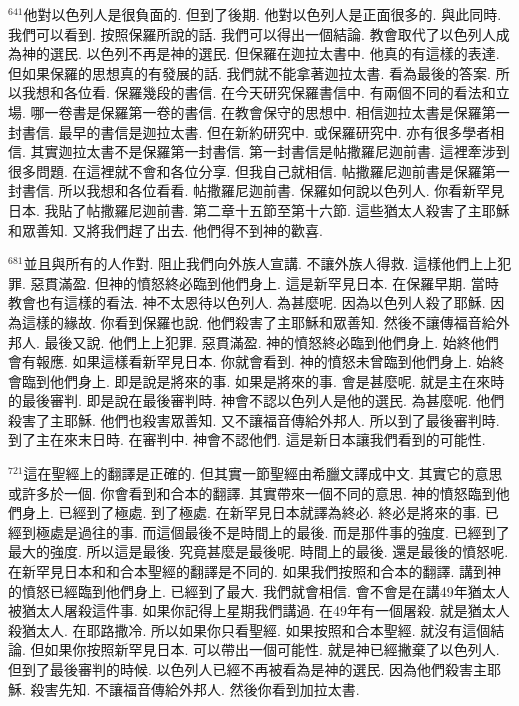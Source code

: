 \documentclass{book}
\begin{document}
$^{641}$他對以色列人是很負面的.
但到了後期.
他對以色列人是正面很多的.
與此同時.
我們可以看到.
按照保羅所說的話.
我們可以得出一個結論.
教會取代了以色列人成為神的選民.
以色列不再是神的選民.
但保羅在迦拉太書中.
他真的有這樣的表達.
但如果保羅的思想真的有發展的話.
我們就不能拿著迦拉太書.
看為最後的答案.
所以我想和各位看.
保羅幾段的書信.
在今天研究保羅書信中.
有兩個不同的看法和立場.
哪一卷書是保羅第一卷的書信.
在教會保守的思想中.
相信迦拉太書是保羅第一封書信.
最早的書信是迦拉太書.
但在新約研究中.
或保羅研究中.
亦有很多學者相信.
其實迦拉太書不是保羅第一封書信.
第一封書信是帖撒羅尼迦前書.
這裡牽涉到很多問題.
在這裡就不會和各位分享.
但我自己就相信.
帖撒羅尼迦前書是保羅第一封書信.
所以我想和各位看看.
帖撒羅尼迦前書.
保羅如何說以色列人.
你看新罕見日本.
我貼了帖撒羅尼迦前書.
第二章十五節至第十六節.
這些猶太人殺害了主耶穌和眾善知.
又將我們趕了出去.
他們得不到神的歡喜.

$^{681}$並且與所有的人作對.
阻止我們向外族人宣講.
不讓外族人得救.
這樣他們上上犯罪.
惡貫滿盈.
但神的憤怒終必臨到他們身上.
這是新罕見日本.
在保羅早期.
當時教會也有這樣的看法.
神不太恩待以色列人.
為甚麼呢.
因為以色列人殺了耶穌.
因為這樣的緣故.
你看到保羅也說.
他們殺害了主耶穌和眾善知.
然後不讓傳福音給外邦人.
最後又說.
他們上上犯罪.
惡貫滿盈.
神的憤怒終必臨到他們身上.
始終他們會有報應.
如果這樣看新罕見日本.
你就會看到.
神的憤怒未曾臨到他們身上.
始終會臨到他們身上.
即是說是將來的事.
如果是將來的事.
會是甚麼呢.
就是主在來時的最後審判.
即是說在最後審判時.
神會不認以色列人是他的選民.
為甚麼呢.
他們殺害了主耶穌.
他們也殺害眾善知.
又不讓福音傳給外邦人.
所以到了最後審判時.
到了主在來末日時.
在審判中.
神會不認他們.
這是新日本讓我們看到的可能性.

$^{721}$這在聖經上的翻譯是正確的.
但其實一節聖經由希臘文譯成中文.
其實它的意思或許多於一個.
你會看到和合本的翻譯.
其實帶來一個不同的意思.
神的憤怒臨到他們身上.
已經到了極處.
到了極處.
在新罕見日本就譯為終必.
終必是將來的事.
已經到極處是過往的事.
而這個最後不是時間上的最後.
而是那件事的強度.
已經到了最大的強度.
所以這是最後.
究竟甚麼是最後呢.
時間上的最後.
還是最後的憤怒呢.
在新罕見日本和和合本聖經的翻譯是不同的.
如果我們按照和合本的翻譯.
講到神的憤怒已經臨到他們身上.
已經到了最大.
我們就會相信.
會不會是在講49年猶太人被猶太人屠殺這件事.
如果你記得上星期我們講過.
在49年有一個屠殺.
就是猶太人殺猶太人.
在耶路撒冷.
所以如果你只看聖經.
如果按照和合本聖經.
就沒有這個結論.
但如果你按照新罕見日本.
可以帶出一個可能性.
就是神已經撇棄了以色列人.
但到了最後審判的時候.
以色列人已經不再被看為是神的選民.
因為他們殺害主耶穌.
殺害先知.
不讓福音傳給外邦人.
然後你看到加拉太書.
\end{document}
